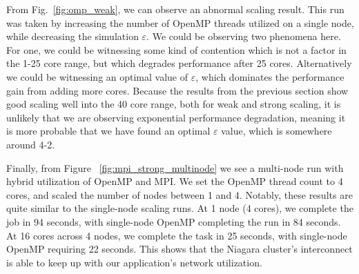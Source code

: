 
From Fig.~\ref{fig:omp_weak}, we can observe an abnormal scaling result. This run was taken by increasing the number of OpenMP threads utilized on a single node, while decreasing the simulation $\varepsilon$. We could be observing two phenomena here. For one, we could be witnessing some kind of contention which is not a factor in the 1-25 core range, but which degrades performance after 25 cores. Alternatively we could be witnessing an optimal value of $\varepsilon$, which dominates the performance gain from adding more cores. Because the results from the previous section show good scaling well into the 40 core range, both for weak and strong scaling, it is unlikely that we are observing exponential performance degradation, meaning it is more probable that we have found an optimal $\varepsilon$ value, which is somewhere around 4-2. 

Finally, from Figure ~\ref{fig:mpi_strong_multinode} we see a multi-node run with hybrid utilization of OpenMP and MPI. We set the OpenMP thread count to 4 cores, and scaled the number of nodes between 1 and 4. Notably, these results are quite similar to the single-node scaling runs. At 1 node (4 cores), we complete the job in 94 seconds, with single-node OpenMP completing the run in 84 seconds. At 16 cores across 4 nodes, we complete the task in 25 seconds, with single-node OpenMP requiring 22 seconds. This shows that the Niagara cluster's interconnect is able to keep up with our application's network utilization. 




